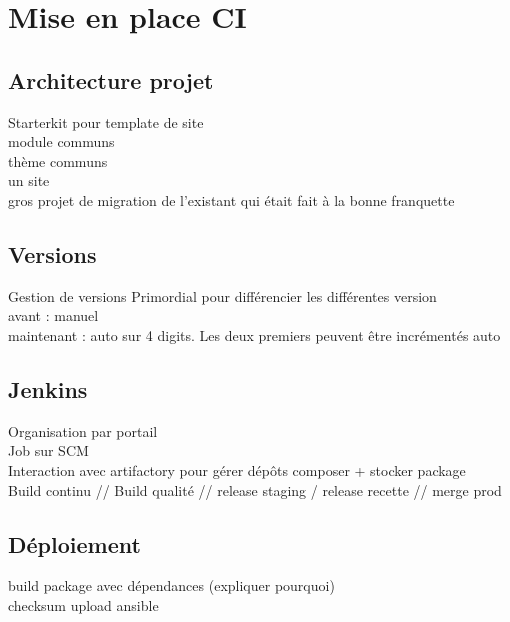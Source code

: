 \section{Mise en place CI}
\subsection[Architecture]{Architecture projet}
\begin{frame}{\subsecname}
	Starterkit pour template de site
	 \\
	 module communs
	 \\
	 thème communs
	 \\
	 un site 
	 \\ gros projet de migration de l'existant qui était fait à la bonne franquette
\end{frame}

\subsection{Versions}
\begin{frame}{Gestion de versions}
	Primordial pour différencier les différentes version \\
	avant : manuel \\
	maintenant : auto sur 4 digits. Les deux premiers peuvent être incrémentés auto
\end{frame}

\subsection{Jenkins}
\begin{frame}{\subsecname}
	Organisation par portail \\ 
	Job sur SCM \\
	Interaction avec artifactory pour gérer dépôts composer + stocker package \\
	Build continu // Build qualité // release staging / release recette // merge prod
\end{frame}

\subsection{Déploiement}
\begin{frame}{\subsecname}
	build package avec dépendances (expliquer pourquoi)\\
	checksum
	upload
	ansible
\end{frame}

